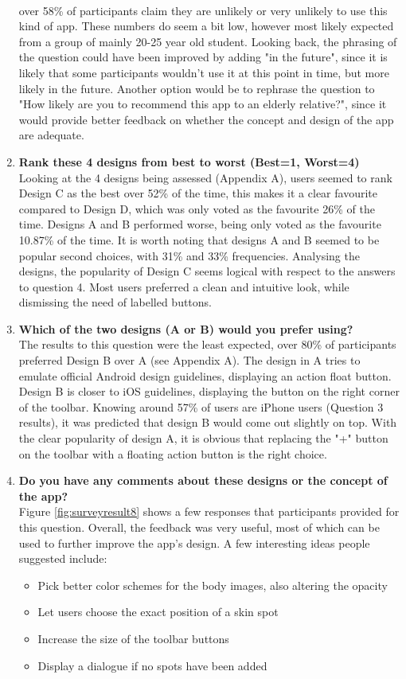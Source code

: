 \begin{enumerate}
    \\ over 58\% of participants claim they are unlikely or very unlikely to use this kind of app. These numbers do seem a bit low, however most likely expected from a group of mainly 20-25 year old student. Looking back, the phrasing of the question could have been improved by adding "in the future", since it is likely that some participants wouldn't use it at this point in time, but more likely in the future. Another option would be to rephrase the question to "How likely are you to recommend this app to an elderly relative?", since it would provide better feedback on whether the concept and design of the app are adequate. 
    \item \textbf{Rank these 4 designs from best to worst (Best=1, Worst=4)}
    \\ Looking at the 4 designs being assessed (Appendix A), users seemed to rank Design C as the best over 52\% of the time, this makes it a clear favourite compared to Design D, which was only voted as the favourite 26\% of the time. Designs A and B performed worse, being only voted as the favourite 10.87\% of the time. It is worth noting that designs A and B seemed to be popular second choices, with 31\% and 33\% frequencies. Analysing the designs, the popularity of Design C seems logical with respect to the answers to question 4. Most users preferred a clean and intuitive look, while dismissing the need of labelled buttons.
    \item \textbf{Which of the two designs (A or B) would you prefer using?}
    \\ The results to this question were the least expected, over 80\% of participants preferred Design B over A (see Appendix A). The design in A tries to emulate official Android design guidelines, displaying an action float button. Design B is closer to iOS guidelines, displaying the button on the right corner of the toolbar. Knowing around 57\% of users are iPhone users (Question 3 results), it was predicted that design B would come out slightly on top. With the clear popularity of design A, it is obvious that replacing the "+" button on the toolbar with a floating action button is the right choice.
    \item \textbf{Do you have any comments about these designs or the concept of the app?}
    \\ Figure \ref{fig:surveyresult8} shows a few responses that participants provided for this question. Overall, the feedback was very useful, most of which can be used to further improve the app's design. A few interesting ideas people suggested include:
    \begin{itemize}
        \item Pick better color schemes for the body images, also altering the opacity
        \item Let users choose the exact position of a skin spot
        \item Increase the size of the toolbar buttons
        \item Display a dialogue if no spots have been added
    \end{itemize}
\end{enumerate}
